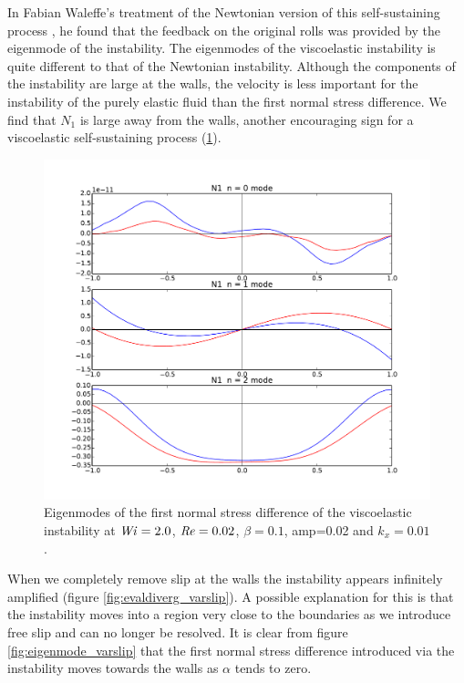 \documentclass{jfm}
\newcommand\Wi{\mbox{\textit{Wi}}}
\newcommand\Rey{\mbox{\textit{Re}}}  %
\begin{document}
In Fabian Waleffe's treatment of the Newtonian version of this self-sustaining
process \cite{Waleffe1997}, he found that the feedback on the original rolls
was provided by the eigenmode of the instability. The eigenmodes of the
viscoelastic instability is quite different to that of the Newtonian
instability. Although the components of the instability are large at the walls,
the velocity is less important for the instability of the purely elastic fluid
than the first normal stress difference. We find that $N_{1}$ is large away
from the walls, another encouraging sign for a viscoelastic self-sustaining
process (\ref{fig:eigenmode_visco}).

\begin{figure}
    \centering
    \includegraphics[width=\textwidth]{./figures/eigenmode_visco}
    \caption{
	Eigenmodes of the first normal stress difference of the viscoelastic
	instability at $\Wi = 2.0$, $\Rey = 0.02$, $\beta=0.1$, amp=0.02 and
	$k_x = 0.01$.
    }
    \label{fig:eigenmode_visco}
\end{figure}

When we completely remove slip at the walls the instability appears infinitely
amplified (figure \ref{fig:evaldiverg_varslip}). A possible explanation for
this is that the instability moves into a region very close to the boundaries
as we introduce free slip and can no longer be resolved. It is clear from
figure \ref{fig:eigenmode_varslip} that the first normal stress difference
introduced via the instability moves towards the walls as $\alpha$ tends to
zero.
\end{document}

